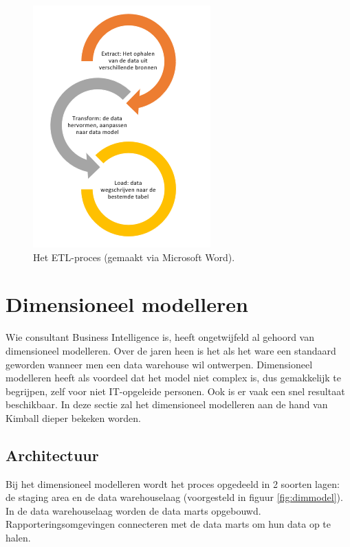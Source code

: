 \begin{figure}[h]
	\centering
	\includegraphics[scale=1]{../images/ETL.PNG}
	\caption{Het ETL-proces (gemaakt via Microsoft Word).}
	\label{fig:etl}
\end{figure}

\pagebreak

\section{Dimensioneel modelleren}
Wie consultant Business Intelligence is, heeft ongetwijfeld al gehoord van dimensioneel modelleren. Over de jaren heen is het als het ware een standaard geworden wanneer men een data warehouse wil ontwerpen. Dimensioneel modelleren heeft als voordeel dat het model niet complex is, dus gemakkelijk te begrijpen, zelf voor niet IT-opgeleide personen. Ook is er vaak een snel resultaat beschikbaar. In deze sectie zal het dimensioneel modelleren aan de hand van Kimball dieper bekeken worden. 


\subsection{Architectuur}
Bij het dimensioneel modelleren wordt het proces opgedeeld in 2 soorten lagen: de staging area en de data warehouselaag (voorgesteld in figuur \ref{fig:dimmodel}). In de data warehouselaag worden de data marts opgebouwd. Rapporteringsomgevingen connecteren met de data marts om hun data op te halen.

